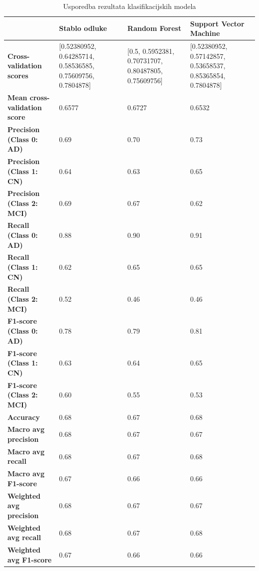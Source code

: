 \documentclass[zavrsnirad]{fer}
\begin{document}
\begin{table}[h!]
	\centering
	\begin{tabularx}{\textwidth}{|X|X|X|X|}
		\hline
		& \textbf{Stablo odluke} & \textbf{Random Forest} & \textbf{Support Vector Machine} \\ \hline
		\textbf{Cross-validation scores} & [0.52380952, 0.64285714, 0.58536585, 0.75609756, 0.7804878] & [0.5, 0.5952381, 0.70731707, 0.80487805, 0.75609756] & [0.52380952, 0.57142857, 0.53658537, 0.85365854, 0.7804878] \\ \hline
		\textbf{Mean cross-validation score} & 0.6577 & 0.6727 & 0.6532 \\ \hline
		\textbf{Precision (Class 0: AD)} & 0.69 & 0.70 & 0.73 \\ \hline
		\textbf{Precision (Class 1: CN)} & 0.64 & 0.63 & 0.65 \\ \hline
		\textbf{Precision (Class 2: MCI)} & 0.69 & 0.67 & 0.62 \\ \hline
		\textbf{Recall (Class 0: AD)} & 0.88 & 0.90 & 0.91 \\ \hline
		\textbf{Recall (Class 1: CN)} & 0.62 & 0.65 & 0.65 \\ \hline
		\textbf{Recall (Class 2: MCI)} & 0.52 & 0.46 & 0.46 \\ \hline
		\textbf{F1-score (Class 0: AD)} & 0.78 & 0.79 & 0.81 \\ \hline
		\textbf{F1-score (Class 1: CN)} & 0.63 & 0.64 & 0.65 \\ \hline
		\textbf{F1-score (Class 2: MCI)} & 0.60 & 0.55 & 0.53 \\ \hline
		\textbf{Accuracy} & 0.68 & 0.67 & 0.68 \\ \hline
		\textbf{Macro avg precision} & 0.68 & 0.67 & 0.67 \\ \hline
		\textbf{Macro avg recall} & 0.68 & 0.67 & 0.68 \\ \hline
		\textbf{Macro avg F1-score} & 0.67 & 0.66 & 0.66 \\ \hline
		\textbf{Weighted avg precision} & 0.68 & 0.67 & 0.67 \\ \hline
		\textbf{Weighted avg recall} & 0.68 & 0.67 & 0.68 \\ \hline
		\textbf{Weighted avg F1-score} & 0.67 & 0.66 & 0.66 \\ \hline
	\end{tabularx}
	\caption{Usporedba rezultata klasifikacijskih modela}
	\label{tab:classification_results}
\end{table}
\end{document}
